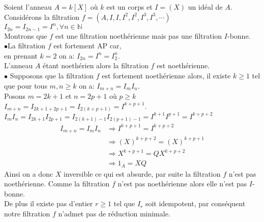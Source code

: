 \begin{monexemple}
	Soient l'anneau $A = k\left[ X\right]$ où $k$ est un corps et $I = (X)$ un idéal de $A$.\\
	Considérons la filtration $f = (A, I, I, I^2, I^2, I^3, I^3, \cdots)$\\
	$I_{2n} = I_{2n-1} = I^n, \forall n \in \mathbb{N}$\\
	Montrons que $f$ est une filtration noethérienne mais pas une filtration $I$-bonne.\\
	$\bullet$La filtration $f$ est fortement AP car, \\en prenant $k = 2$ on a: $I_{2n} = I^n = I_2^n$.\\
	L’anneau $A$ étant noethérien alors la filtration $f$ est noethérienne.\\
	$\bullet$ Supposons que la filtration $f$ est fortement noethérienne alors, il existe $k \geq 1$ tel que pour tous $m, n \geq k$ on a: $I_{m+n} = I_m I_n$.\\
	Posons $m = 2k+1$ et $n = 2p+1$ où $p \geq k$\\
	$I_{m+n} = I_{2k+1+2p+1} = I_{2(k+p+1)} = I^{k+p+1}$.\\
	$I_m I_n =  I_{2k+1}  I_{2p+1} =  I_{2(k+1)-1}  I_{2(p+1)-1} = I^{k+1} I^{p+1} = I^{k+p+2}$
	\begin{align*}
		I_{m+n} = I_m I_n &\Rightarrow I^{k+p+1} = I^{k+p+2}\\
		& \Rightarrow (X)^{k+p+2} = (X)^{k+p+1}\\
		&\Rightarrow X^{k+p+1} = QX^{k+p+2}\\
		&\Rightarrow 1_A = XQ
	\end{align*}
	Ainsi on a donc $X$ inversible ce qui est absurde, par suite la filtration $f$ n'est pas noethérienne. Comme la filtration $f$ n'est pas noethérienne alors elle n'est pas $I$-bonne.\\ De plus il existe pas d'entier $r \geq 1$ tel que $I_r$ soit idempotent, par conséquent notre filtration $f$ n'admet pas de réduction minimale.
\end{monexemple}

